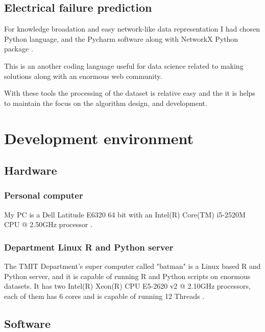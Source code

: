 		\subsection{Electrical failure prediction}
For knowledge broadation and easy network-like data representation I had chosen Python language, and the Pycharm software \cite{PyCharm} along with NetworkX Python package \cite{NetworkX}.

This is an another coding language useful for data science related to making solutions along with an enormous web community. 

With these tools the processing of the dataset is relative easy and the it is helps to maintain the focus on the algorithm design, and development.
	\section{Development environment}
		\subsection{Hardware}
			\subsubsection{Personal computer}
My PC is a Dell Latitude E6320 64 bit with an Intel(R) Core(TM) i5-2520M CPU @ 2.50GHz processor \cite{Latitude}.
			\subsubsection{Department Linux R and Python server}
The TMIT Department's super computer called "batman" is a Linux based R and Python server, and it is capable of running R and Python scripts on enormous datasets. It has two Intel(R) Xeon(R) CPU E5-2620 v2 @ 2.10GHz processors, each of them has 6 cores and is capable of running 12 Threads \cite{Batman}.
		\subsection{Software}
